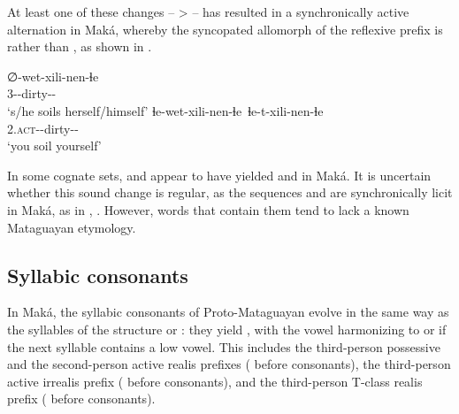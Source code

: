 \begin{exe}
    \ex \soninlaw
    \ex \likelove
    \ex \heartmn
\end{exe}

At least one of these changes --  >  -- has resulted in a synchronically active alternation in Maká, whereby the syncopated allomorph of the reflexive prefix  is  rather than  \citep[114]{AG94}, as shown in .

\ea\label{ex:wet:1:mk}
    \begin{xlist}
        \ex\gll ∅-wet-xili-nen-ɬe\\
                3-\REFL-dirty-\CAUS-\REFL\\
                \glt `s/he soils herself/himself'
        \ex\gll ɬe-wet-xili-nen-ɬe~\recind ɬe-t-xili-nen-ɬe\\
                2.{\textsc{act}}-\REFL-dirty-\CAUS-\REFL\\
                \glt `you soil yourself'
    \end{xlist}
\z

In some cognate sets,  and  appear to have yielded  and  in Maká. It is uncertain whether this sound change is regular, as the sequences  and  are synchronically licit in Maká, as in , . However, words that contain them tend to lack a known Mataguayan etymology.

\begin{exe}
    \ex \samto
    \ex \samtok
    \ex \wamqa
\end{exe}

\subsection{Syllabic consonants}\label{mk-syll-c}

In Maká, the syllabic consonants of Proto-Mataguayan evolve in the same way as the syllables of the structure  or : they yield , with the vowel harmonizing to  or  if the next syllable contains a low vowel. This includes the third-person possessive and the second-person active realis prefixes ( before consonants), the third-person active irrealis prefix ( before consonants), and the third-person T-class realis prefix ( before consonants).

